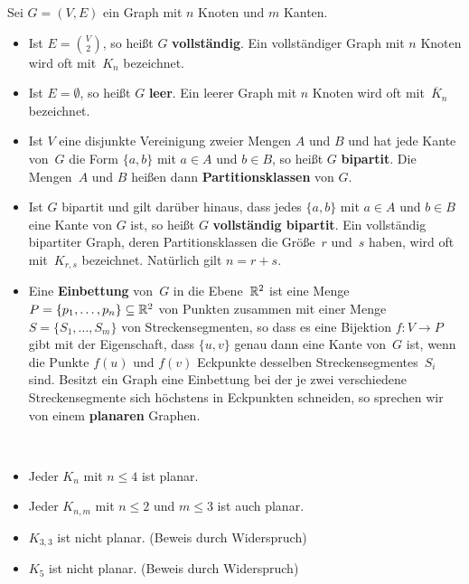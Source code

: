 \begin{defn}[Graphenklassen]
Sei $G=(V,E)$ ein Graph mit $n$ Knoten und $m$ Kanten.
\begin{itemize}
 \item Ist $E=\binom{V}{2}$, so heißt $G$ \textbf{vollständig}.
 Ein vollständiger Graph mit $n$ Knoten wird oft mit~$K_n$ bezeichnet.

 \item Ist $E=\emptyset$, so heißt $G$ \textbf{leer}.
 Ein leerer Graph mit $n$ Knoten wird oft mit~$\overline K_n$ bezeichnet.

 \item Ist $V$ eine disjunkte Vereinigung zweier Mengen $A$ und $B$ und hat jede Kante von~$G$ die Form $\{a,b\}$ mit $a \in A$ und $b \in B$, so heißt $G$ \textbf{bipartit}.
 Die Mengen~$A$ und $B$ heißen dann \textbf{Partitionsklassen} von $G$. 

\condclearpage 

 \item Ist $G$ bipartit und gilt darüber hinaus, dass jedes $\{a,b\}$ mit $a \in A$ und $b \in B$ eine Kante von $G$ ist, so heißt $G$ \textbf{vollständig bipartit}.
 Ein vollständig bipartiter Graph, deren Partitionsklassen die Größe~$r$ und~$s$ haben, wird oft mit~$K_{r,s}$ bezeichnet.
 Natürlich gilt $n = r + s$.
 
 \item Eine \textbf{Einbettung} von~$G$ in die Ebene~$\mathbb{R}^2$ ist eine Menge $P=\{p_1,\ldots,p_n\} \subseteq \mathbb{R}^2$ von Punkten zusammen mit einer Menge $S=\{S_1,\ldots,S_m\}$ von Streckensegmenten, so dass es eine Bijektion $f:V \to P$ gibt mit der Eigenschaft, dass $\{u,v\}$ genau dann eine Kante von~$G$ ist, wenn die Punkte $f(u)$ und $f(v)$ Eckpunkte desselben Streckensegmentes~$S_i$ sind.
% 
 Besitzt ein Graph eine Einbettung bei der je zwei verschiedene Streckensegmente sich höchstens in Eckpunkten schneiden, so sprechen wir von einem \textbf{planaren} Graphen.
 \end{itemize}
\end{defn} 

\begin{bsp}\
	\begin{itemize} 
	\item  Jeder $K_n$ mit $n\leq4$ ist planar. 
	 \item Jeder $K_{n,m}$ mit $n \le 2$ und $m \le 3$ ist auch planar. 
	 \item $K_{3,3}$ ist nicht planar. (Beweis durch Widerspruch)
	 \item $K_5$ ist nicht planar. (Beweis durch Widerspruch) 
	 \end{itemize} 
\end{bsp} 

